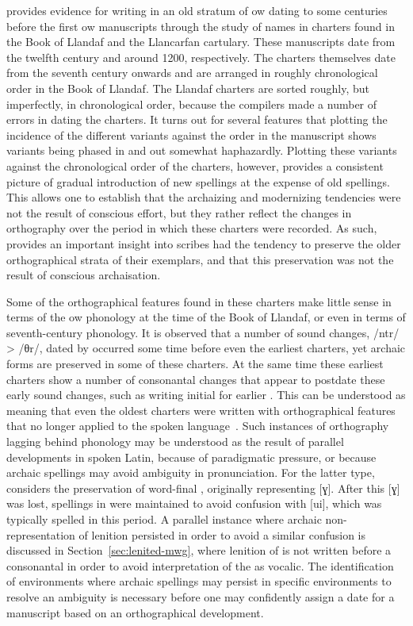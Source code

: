 \Textcite{Sim_emergenceOld91} provides evidence for writing in an old stratum of \gls{ow} dating to some centuries before the first \gls{ow}  manuscripts through the study of names in charters found in the Book of Llandaf and the Llancarfan cartulary. These manuscripts date from the twelfth century and around 1200, respectively. The charters themselves date from the seventh century onwards and are arranged in roughly chronological order in the Book of Llandaf. 
The Llandaf charters are sorted  roughly, but imperfectly, in chronological order, because the compilers made a number of errors in dating the charters.  It turns out for several features that plotting the incidence of the different variants against the order in the manuscript shows variants being phased in and out somewhat haphazardly. Plotting these variants against the chronological order of the charters, however, provides a consistent picture of gradual introduction of new spellings at the expense of old spellings. This allows one to establish that the archaizing and modernizing tendencies were not the result of conscious effort, but they rather reflect the changes in orthography over the period in which these charters were recorded. As such, \textcite{Sim_emergenceOld91} provides an important insight into scribes had the tendency to preserve the older orthographical strata of their exemplars, and that this preservation was not the result of conscious archaisation.

Some of the orthographical features found in these charters make little sense in terms of the \gls{ow} phonology at the time of the Book of Llandaf, or even in terms of seventh-century phonology. It is observed that a number of sound changes, \eg /ntr/ > /θr/, dated by \textcite{jackson_language_1953} occurred some time before even the earliest charters, yet archaic forms are preserved in some of these charters. At the same time these earliest charters show a number of consonantal changes that appear to postdate these early sound changes, such as writing initial  for earlier . This can be understood as meaning that even the oldest charters were written with orthographical features that no longer applied to the spoken language~\autocite[73]{Sim_emergenceOld91}. Such instances of orthography lagging behind phonology may be understood as the result of parallel developments in spoken Latin, because of paradigmatic pressure, or because archaic spellings may avoid ambiguity in pronunciation. For the latter type, \textcite[75]{Sim_emergenceOld91} considers the preservation of word-final , originally representing [ɣ]. After this [ɣ] was lost, spellings in  were maintained to avoid confusion with [ui], which was typically spelled  in this period. A parallel instance where archaic non-representation of lenition persisted in order to avoid a similar confusion is discussed in Section~\ref{sec:lenited-mwg}, where lenition of  is not written before a consonantal  in order to avoid interpretation of the  as vocalic. The identification of environments where archaic spellings may persist in specific environments to resolve an ambiguity is necessary  before one may confidently assign a date for a manuscript based on an orthographical development.

